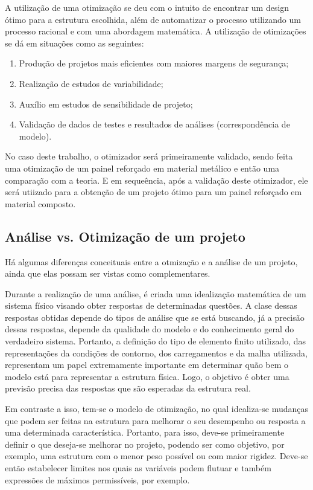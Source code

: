 A utilização de uma otimização se deu com o intuito de encontrar um design ótimo para a estrutura escolhida, além de automatizar o processo utilizando um processo racional e com uma abordagem matemática. A utilização de otimizações se dá em situações como as seguintes:
\begin{enumerate}
  \item Produção de projetos mais eficientes com maiores margens de segurança;
  \item Realização de estudos de variabilidade;
  \item Auxílio em estudos de sensibilidade de projeto;
  \item Validação de dados de testes e resultados de análises (correspondência de modelo).
\end {enumerate}
No caso deste trabalho, o otimizador será primeiramente validado, sendo feita uma otimização de um painel reforçado em material metálico e então uma comparação com a teoria. E em sequeência, após a validação deste otimizador, ele será utiizado para a obtenção de um projeto ótimo para um painel reforçado em material composto.

\subsection{Análise vs. Otimização de um projeto}
Há algumas diferenças conceituais entre a otmização e a análise de um projeto, ainda que elas possam ser vistas como complementares.

 Durante a realização de uma análise, é criada uma idealização matemática de um sistema físico visando obter respostas de determinadas questões. A clase dessas respostas obtidas depende do tipos de análise que se está buscando, já a precisão dessas respostas, depende da qualidade do modelo e do conhecimento geral do verdadeiro sistema. Portanto, a definição do tipo de elemento finito utilizado, das representações da condições de contorno, dos carregamentos e da malha utilizada, representam um papel extremamente importante em determinar quão bem o modelo está para representar a estrutura física. Logo, o objetivo é obter uma previsão precisa das respostas que são esperadas da estrutura real.

 Em contraste a isso, tem-se o modelo de otimização, no qual idealiza-se mudanças que podem ser feitas na estrutura para melhorar o seu desempenho ou resposta a uma determinada característica. Portanto, para isso, deve-se primeiramente definir o que deseja-se melhorar no projeto, podendo ser como objetivo, por exemplo, uma estrutura com o menor peso possível ou com maior rigidez. Deve-se então estabelecer limites nos quais as variáveis podem flutuar e também expressões de máximos permissíveis, por exemplo.

